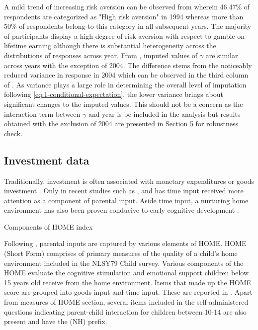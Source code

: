\documentclass[]{article}
\begin{document}
A mild trend of increasing risk aversion can be observed from  wherein 46.47\% of respondents are categorized as "High risk aversion" in 1994 whereas more than 50\% of respondents belong to this category in all subsequent years. The majority of participants display a high degree of risk aversion with respect to gamble on lifetime earning although there is substantial heterogeneity across the distributions of responses across year. From , imputed values of $\gamma$ are similar across years with the exception of 2004. The difference stems from the noticeably reduced variance in response in 2004 which can be observed in the third column of . As variance plays a large role in determining the overall level of imputation following \eqref{eq:1-conditional-expectation}, the lower variance brings about significant changes to the imputed values. This should not be a concern as the interaction term between $\gamma$ and year is be included in the analysis but results obtained with the exclusion of 2004 are presented in Section 5 for robustness check.











\subsection{Investment data}
Traditionally, investment is often associated with monetary expenditures or goods investment \citep{heckman2014economics}. Only in recent studies such as \citet{carneiro2016partial}, \citet{bono2016early} and \citet{del2016transfers} has time input received more attention as a component of parental input. Aside time input, a nurturing home environment has also been proven conducive to early cognitive development \citep{altman2013home, iverson1982home}. 

\begin{table}[!t]
	\centering
	\setlength{\extrarowheight}{0.2em}
	\caption{Components of HOME index}	
	
	\label{table:4-HOME}
\end{table} 

Following \citet{carneiro2016partial}, parental inputs are captured by various elements of HOME. HOME (Short Form) comprises of primary measures of the quality of a child's home environment included in the NLSY79 Child survey. Various components of the HOME evaluate the cognitive stimulation and emotional support children below 15 years old receive from the home environment. Items that made up the HOME score are grouped into goods input and time input. These are reported in . Apart from measures of HOME section, several items included in the self-administered questions indicating parent-child interaction for children between 10-14 are also present and have the (NH) prefix.  
 
\end{document}
